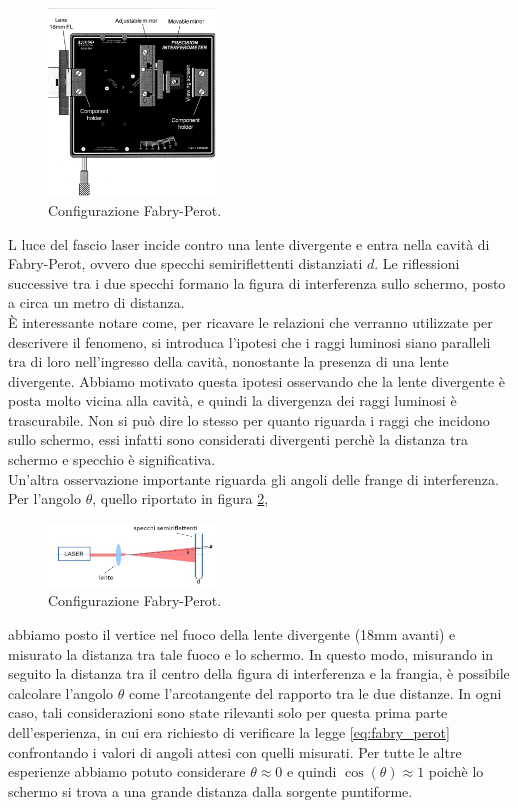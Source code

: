 \documentclass[letterpaper,12pt]{article}
\begin{document}
\begin{figure}[ht]
    \centering
    \includegraphics[width=0.4\textwidth]{InterferometroFabry.png}
    \caption{Configurazione Fabry-Perot.}
    \label{fig:fabry-perot config}
\end{figure}

L luce del fascio laser incide contro una lente divergente e entra nella cavità di Fabry-Perot, ovvero due specchi semiriflettenti 
distanziati $d$. Le riflessioni successive tra i due specchi formano la figura di interferenza sullo schermo, posto
a circa un metro di distanza. \\ 
È interessante notare come, per ricavare le relazioni che verranno utilizzate per descrivere il fenomeno, si 
introduca l'ipotesi che i raggi luminosi siano paralleli tra di loro nell'ingresso della cavità, nonostante la 
presenza di una lente divergente. Abbiamo motivato questa ipotesi osservando che la lente divergente è posta
molto vicina alla cavità, e quindi la divergenza dei raggi luminosi è trascurabile. Non si può dire lo stesso per 
quanto riguarda i raggi che incidono sullo schermo, essi infatti sono considerati divergenti perchè la distanza tra
schermo e specchio è significativa.\\
Un'altra osservazione importante riguarda gli angoli delle frange di interferenza. 
Per l'angolo $\theta$, quello riportato in figura \ref{fig:fabry_perot_scheda},
\begin{figure}[h!]
    \centering
    \includegraphics[width=0.4\textwidth]{fabry_perot_config.JPG}
    \caption{Configurazione Fabry-Perot.}
    \label{fig:fabry_perot_scheda}
\end{figure}

abbiamo posto il vertice nel fuoco della lente divergente (18mm avanti) e misurato la distanza tra tale fuoco e lo schermo. 
In questo modo, misurando in seguito la distanza tra il centro della figura di interferenza e la frangia, 
è possibile calcolare l'angolo $\theta$ come l'arcotangente del rapporto tra le due distanze. In ogni caso, tali 
considerazioni sono state rilevanti solo per questa prima parte dell'esperienza, in cui era richiesto di verificare 
la legge \ref{eq:fabry_perot} confrontando i valori di angoli attesi con quelli misurati. Per tutte le altre esperienze 
abbiamo potuto considerare $\theta \approx 0$ e quindi $\cos(\theta) \approx 1$ poichè lo schermo si trova 
a una grande distanza dalla sorgente puntiforme.
\end{document}
